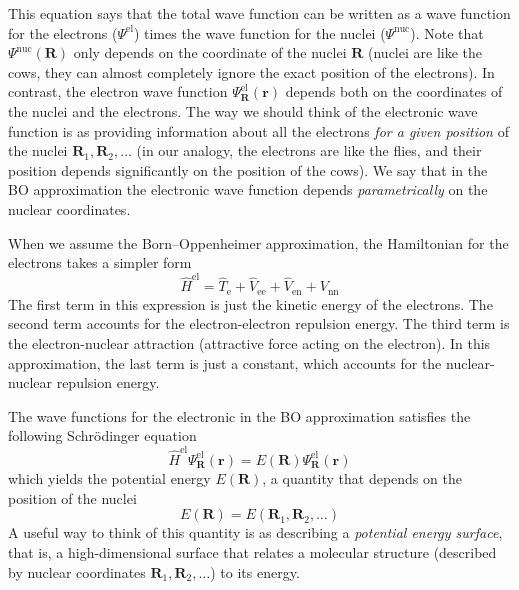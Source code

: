 \documentclass[../Main/notes.tex]{subfiles}
\begin{document}
This equation says that the total wave function can be written as a wave function for the electrons ($\Psi^\mathrm{el}$) times the wave function for the nuclei ($\Psi^\mathrm{nuc}$).
Note that $\Psi^\mathrm{nuc}(\mathbf{R} )$ only depends on the coordinate of the nuclei $\mathbf{R}$ (nuclei are like the cows, they can almost completely ignore the exact position of the electrons).
In contrast, the electron wave function $\Psi_{\mathbf{R}}^\mathrm{el}(\mathbf{r})$ depends both on the coordinates of the nuclei and the electrons.
The way we should think of the electronic wave function is as providing information about all the electrons \emph{for a given position} of the nuclei $ \mathbf{R}_1,  \mathbf{R}_2,\ldots$ (in our analogy, the electrons are like the flies, and their position depends significantly on the position of the cows).
We say that in the BO approximation the electronic wave function depends \emph{parametrically} on the nuclear coordinates.

When we assume the Born--Oppenheimer approximation, the Hamiltonian for the electrons takes a simpler form
\begin{equation}
\hat{H}^\mathrm{el} = \hat{T}_\mathrm{e} + \hat{V}_\mathrm{ee} + \hat{V}_\mathrm{en} + V_\mathrm{nn}
\end{equation}
The first term in this expression is just the kinetic energy of the electrons. The second term accounts for the electron-electron repulsion energy. The third term is the electron-nuclear attraction (attractive force acting on the electron). In this approximation, the last term is just a constant, which accounts for the nuclear-nuclear repulsion energy.

The wave functions for the electronic in the BO approximation satisfies the following Schr\"{o}dinger equation
\begin{equation}
\label{eq:electronic_SE}
\hat{H}^\mathrm{el}\Psi_{\mathbf{R}}^\mathrm{el}(\mathbf{r}) =
E(\mathbf{R})
\Psi_{\mathbf{R}}^\mathrm{el}(\mathbf{r})
\end{equation}
which yields the potential energy $E(\mathbf{R})$, a quantity that depends on the position of the nuclei
\begin{equation}
E(\mathbf{R})= E(\mathbf{R}_1,  \mathbf{R}_2,\ldots)
\end{equation}
A useful way to think of this quantity is as describing a \emph{potential energy surface}, that is, a high-dimensional surface that relates a molecular structure (described by nuclear coordinates $\mathbf{R}_1,  \mathbf{R}_2,\ldots$) to its energy.
\end{document}
